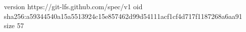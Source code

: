 version https://git-lfs.github.com/spec/v1
oid sha256:a59344540a15a5513924c15e857462d99d54111acf1cf4d717f1187268a6aa91
size 57
